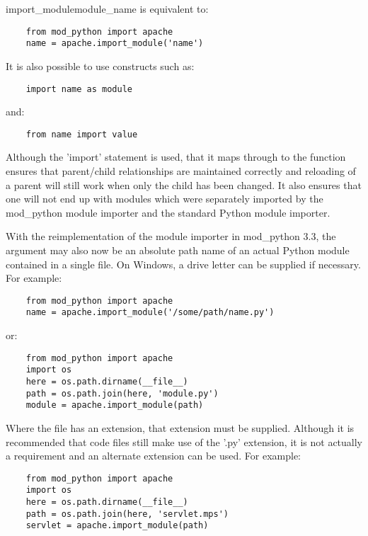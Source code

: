\begin{funcdesc}{import_module}{module_name}
  is equivalent to:

  \begin{verbatim}
    from mod_python import apache
    name = apache.import_module('name')
  \end{verbatim}

  It is also possible to use constructs such as:

  \begin{verbatim}
    import name as module
  \end{verbatim}

  and:

  \begin{verbatim}
    from name import value
  \end{verbatim}

  Although the 'import' statement is used, that it maps through to the
   function ensures that parent/child
  relationships are maintained correctly and reloading of a parent will
  still work when only the child has been changed. It also ensures that one
  will not end up with modules which were separately imported by the
  mod_python module importer and the standard Python module importer.

  With the reimplementation of the module importer in mod_python 3.3, the
   argument may also now be an absolute path name of an
  actual Python module contained in a single file. On Windows, a drive
  letter can be supplied if necessary. For example:

  \begin{verbatim}
    from mod_python import apache
    name = apache.import_module('/some/path/name.py')
  \end{verbatim}

  or:

  \begin{verbatim}
    from mod_python import apache
    import os
    here = os.path.dirname(__file__)
    path = os.path.join(here, 'module.py')
    module = apache.import_module(path)
  \end{verbatim}

  Where the file has an extension, that extension must be supplied. Although
  it is recommended that code files still make use of the '.py' extension,
  it is not actually a requirement and an alternate extension can be used.
  For example:

  \begin{verbatim}
    from mod_python import apache
    import os
    here = os.path.dirname(__file__)
    path = os.path.join(here, 'servlet.mps')
    servlet = apache.import_module(path)
  \end{verbatim}


\end{funcdesc}
